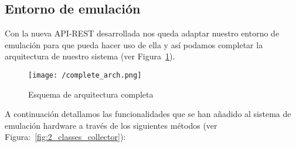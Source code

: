 \subsection{Entorno de emulación}

Con la nueva \acs{API}-\acs{REST} desarrollada nos queda adaptar nuestro entorno de emulación para que pueda hacer uso de ella y así podamos completar la arquitectura de nuestro sistema (ver Figura~\ref{fig:complete_architecture}). 

\begin{figure}[!h]
\centering
\texttt{[image: /complete\_arch.png]}
\caption{Esquema de arquitectura completa}
\label{fig:complete_architecture}
\end{figure}

A continuación detallamos las funcionalidades que se han añadido al sistema de emulación hardware a través de los siguientes métodos (ver Figura:~\ref{fig:2_classes_collector}):

